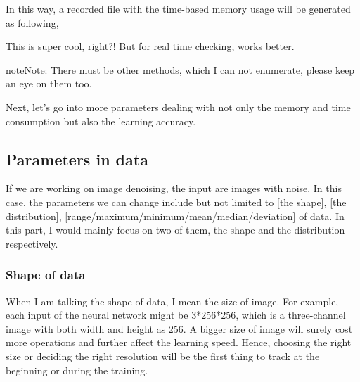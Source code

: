 \documentclass[letterpaper,10pt,english]{sphinxmanual}
\let\sphinxpxdimen\pdfpxdimen\else\newdimen\sphinxpxdimen
\begin{document}
%
\begin{sphinxVerbatim}[commandchars=\\\{\}]
\end{sphinxVerbatim}

In this way, a recorded file with the time-based memory usage will be generated as following,

\noindent{\hspace*{\fill}\sphinxincludegraphics[width=700\sphinxpxdimen]{{MemoryManagement}.png}\hspace*{\fill}}

This is super cool, right?! But for real time checking,  works better.

\begin{sphinxadmonition}{note}{Note:}
There must be other methods, which I can not enumerate, please keep an eye on them too.
\end{sphinxadmonition}

Next, let’s go into more parameters dealing with not only the memory and time consumption but also the learning accuracy.


\subsection{Parameters in data}
\label{\detokenize{usage/adjust:parameters-in-data}}
If we are working on image denoising, the input are images with noise.
In this case, the parameters we can change include but not limited to {[}the shape{]}, {[}the distribution{]}, {[}range/maximum/minimum/mean/median/deviation{]} of data. In this part, I would mainly focus on two of them, the shape and the distribution respectively.


\subsubsection{Shape of data}
\label{\detokenize{usage/adjust:shape-of-data}}
When I am talking the shape of data, I mean the size of image. For example, each input of the neural network might be 3*256*256, which is a three-channel image with both width and height as 256. A bigger size of image will surely cost more operations and further affect the learning speed. Hence, choosing the right size or deciding the right resolution will be the first thing to track at the beginning or during the training.
\end{document}
